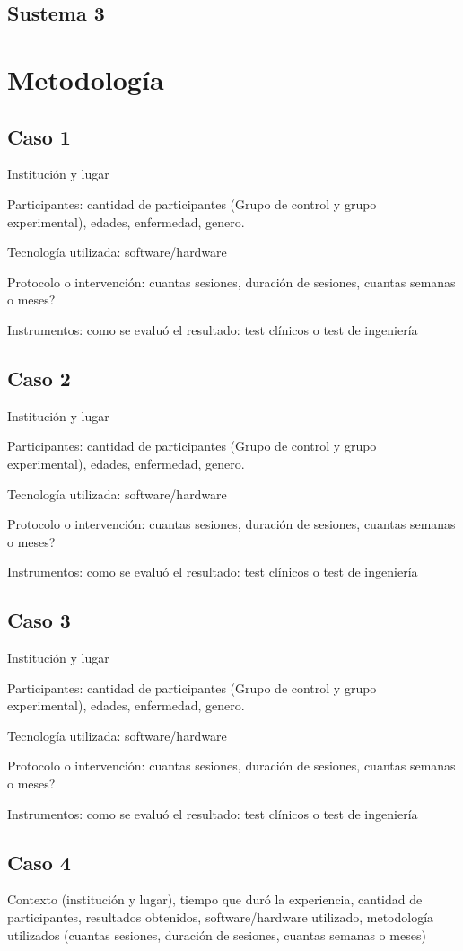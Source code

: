 \documentclass[journal]{IEEEtran}
\begin{document}
\subsection{Sustema 3}


\section{Metodología}
\subsection{Caso 1}
Institución y lugar

Participantes: cantidad de participantes (Grupo de control y grupo experimental), edades, enfermedad, genero.

Tecnología utilizada: software/hardware 

Protocolo o intervención: cuantas sesiones, duración de sesiones, cuantas semanas o meses?

Instrumentos: como se evaluó el resultado: test clínicos o test de ingeniería 

\subsection{Caso 2}
Institución y lugar

Participantes: cantidad de participantes (Grupo de control y grupo experimental), edades, enfermedad, genero.

Tecnología utilizada: software/hardware 

Protocolo o intervención: cuantas sesiones, duración de sesiones, cuantas semanas o meses?

Instrumentos: como se evaluó el resultado: test clínicos o test de ingeniería 


\subsection{Caso 3}
Institución y lugar

Participantes: cantidad de participantes (Grupo de control y grupo experimental), edades, enfermedad, genero.

Tecnología utilizada: software/hardware 

Protocolo o intervención: cuantas sesiones, duración de sesiones, cuantas semanas o meses?

Instrumentos: como se evaluó el resultado: test clínicos o test de ingeniería 


\subsection{Caso 4}
Contexto (institución y lugar), tiempo que duró la experiencia, cantidad de participantes, resultados obtenidos, software/hardware utilizado, metodología utilizados (cuantas sesiones, duración de sesiones, cuantas semanas o meses) 
\end{document}
